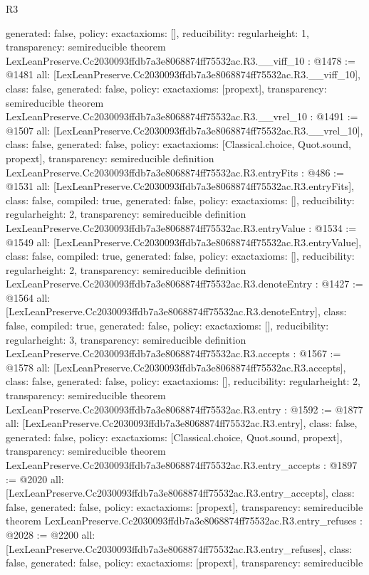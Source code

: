 \begin{lexlean}{R3}
\begin{coremodule}
{  generated: false,
  policy: exact{axioms: []},
  reducibility: regular{height: 1},
  transparency: semireducible
}
theorem LexLeanPreserve.Cc2030093ffdb7a3e8068874ff75532ac.R3.__viff_10 : @1478 := @1481 {
  all: [LexLeanPreserve.Cc2030093ffdb7a3e8068874ff75532ac.R3.__viff_10],
  class: false,
  generated: false,
  policy: exact{axioms: [propext]},
  transparency: semireducible
}
theorem LexLeanPreserve.Cc2030093ffdb7a3e8068874ff75532ac.R3.__vrel_10 : @1491 := @1507 {
  all: [LexLeanPreserve.Cc2030093ffdb7a3e8068874ff75532ac.R3.__vrel_10],
  class: false,
  generated: false,
  policy: exact{axioms: [Classical.choice, Quot.sound, propext]},
  transparency: semireducible
}
definition LexLeanPreserve.Cc2030093ffdb7a3e8068874ff75532ac.R3.entryFits : @486 := @1531 {
  all: [LexLeanPreserve.Cc2030093ffdb7a3e8068874ff75532ac.R3.entryFits],
  class: false,
  compiled: true,
  generated: false,
  policy: exact{axioms: []},
  reducibility: regular{height: 2},
  transparency: semireducible
}
definition LexLeanPreserve.Cc2030093ffdb7a3e8068874ff75532ac.R3.entryValue : @1534 := @1549 {
  all: [LexLeanPreserve.Cc2030093ffdb7a3e8068874ff75532ac.R3.entryValue],
  class: false,
  compiled: true,
  generated: false,
  policy: exact{axioms: []},
  reducibility: regular{height: 2},
  transparency: semireducible
}
definition LexLeanPreserve.Cc2030093ffdb7a3e8068874ff75532ac.R3.denoteEntry : @1427 := @1564 {
  all: [LexLeanPreserve.Cc2030093ffdb7a3e8068874ff75532ac.R3.denoteEntry],
  class: false,
  compiled: true,
  generated: false,
  policy: exact{axioms: []},
  reducibility: regular{height: 3},
  transparency: semireducible
}
definition LexLeanPreserve.Cc2030093ffdb7a3e8068874ff75532ac.R3.accepts : @1567 := @1578 {
  all: [LexLeanPreserve.Cc2030093ffdb7a3e8068874ff75532ac.R3.accepts],
  class: false,
  generated: false,
  policy: exact{axioms: []},
  reducibility: regular{height: 2},
  transparency: semireducible
}
theorem LexLeanPreserve.Cc2030093ffdb7a3e8068874ff75532ac.R3.entry : @1592 := @1877 {
  all: [LexLeanPreserve.Cc2030093ffdb7a3e8068874ff75532ac.R3.entry],
  class: false,
  generated: false,
  policy: exact{axioms: [Classical.choice, Quot.sound, propext]},
  transparency: semireducible
}
theorem LexLeanPreserve.Cc2030093ffdb7a3e8068874ff75532ac.R3.entry_accepts : @1897 := @2020 {
  all: [LexLeanPreserve.Cc2030093ffdb7a3e8068874ff75532ac.R3.entry_accepts],
  class: false,
  generated: false,
  policy: exact{axioms: [propext]},
  transparency: semireducible
}
theorem LexLeanPreserve.Cc2030093ffdb7a3e8068874ff75532ac.R3.entry_refuses : @2028 := @2200 {
  all: [LexLeanPreserve.Cc2030093ffdb7a3e8068874ff75532ac.R3.entry_refuses],
  class: false,
  generated: false,
  policy: exact{axioms: [propext]},
  transparency: semireducible
}


\end{coremodule}
\end{lexlean}
